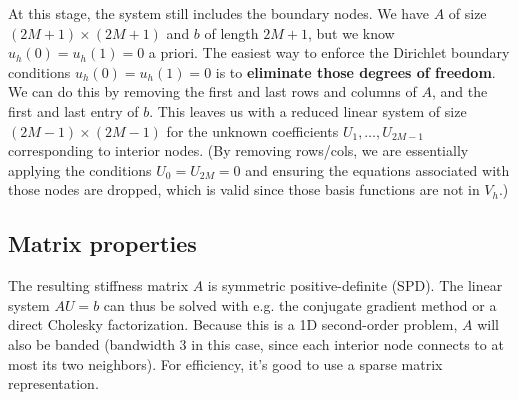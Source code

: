 \documentclass[a4paper,10pt]{report}
\begin{document}
At this stage, the system still includes the boundary nodes. We have \(A\) of size \((2M+1)\times(2M+1)\) and \(b\) of length \(2M+1\), but we know \(u_h(0)=u_h(1)=0\) a priori. 
The easiest way to enforce the Dirichlet boundary conditions \(u_h(0)=u_h(1)=0\) is to \textbf{eliminate those degrees of freedom}. 
We can do this by removing the first and last rows and columns of \(A\), and the first and last entry of \(b\).
This leaves us with a reduced linear system of size \((2M-1)\times(2M-1)\) for the unknown coefficients \(U_1,\dots,U_{2M-1}\) corresponding to interior nodes. (By removing rows/cols, we are essentially applying the conditions \(U_0=U_{2M}=0\) and ensuring the equations associated with those nodes are dropped, which is valid since those basis functions are not in \(V_h\).)

\subsection*{Matrix properties}
The resulting stiffness matrix \(A\) is symmetric positive-definite (SPD). 
The linear system \(A U = b\) can thus be solved with e.g. the conjugate gradient method or a direct Cholesky factorization. 
Because this is a 1D second-order problem, \(A\) will also be banded (bandwidth 3 in this case, since each interior node connects to at most its two neighbors). 
For efficiency, it's good to use a sparse matrix representation.
\end{document}

